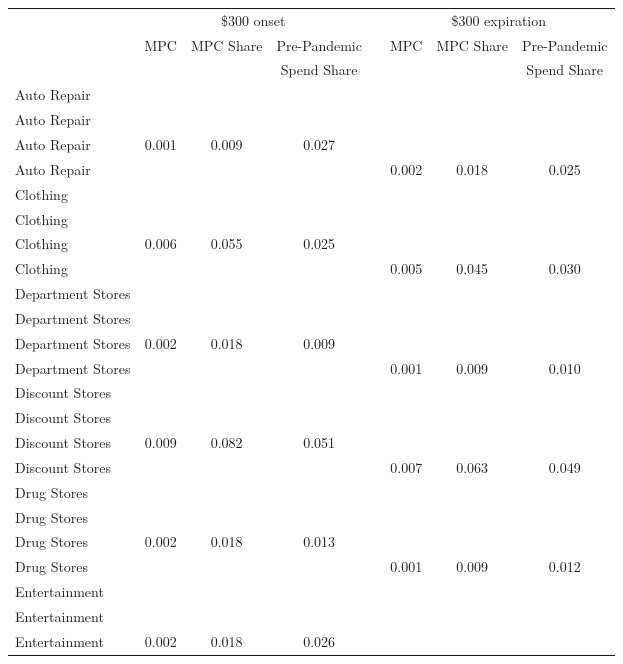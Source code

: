 \begin{table}[ht]
\centering
\begin{tabular}{lccccccc}
   \toprule \toprule & \multicolumn{3}{c}{ \$300 onset} &&\multicolumn{3}{c}{ \$300 expiration}\\ \cmidrule(lr){2-4} \cmidrule(lr){6-8} &MPC & MPC Share & Pre-Pandemic&&MPC & MPC Share & Pre-Pandemic\\  & &   & Spend Share&& &   & Spend Share\\ \midrule    Auto Repair &  &  &  &  &  &  &  \\ 
  Auto Repair &  &  &  &  &  &  &  \\ 
  Auto Repair & 0.001 & 0.009 & 0.027 &  &  &  &  \\ 
  Auto Repair &  &  &  &  & 0.002 & 0.018 & 0.025 \\ 
  Clothing &  &  &  &  &  &  &  \\ 
  Clothing &  &  &  &  &  &  &  \\ 
  Clothing & 0.006 & 0.055 & 0.025 &  &  &  &  \\ 
  Clothing &  &  &  &  & 0.005 & 0.045 & 0.030 \\ 
  Department Stores &  &  &  &  &  &  &  \\ 
  Department Stores &  &  &  &  &  &  &  \\ 
  Department Stores & 0.002 & 0.018 & 0.009 &  &  &  &  \\ 
  Department Stores &  &  &  &  & 0.001 & 0.009 & 0.010 \\ 
  Discount Stores &  &  &  &  &  &  &  \\ 
  Discount Stores &  &  &  &  &  &  &  \\ 
  Discount Stores & 0.009 & 0.082 & 0.051 &  &  &  &  \\ 
  Discount Stores &  &  &  &  & 0.007 & 0.063 & 0.049 \\ 
  Drug Stores &  &  &  &  &  &  &  \\ 
  Drug Stores &  &  &  &  &  &  &  \\ 
  Drug Stores & 0.002 & 0.018 & 0.013 &  &  &  &  \\ 
  Drug Stores &  &  &  &  & 0.001 & 0.009 & 0.012 \\ 
  Entertainment &  &  &  &  &  &  &  \\ 
  Entertainment &  &  &  &  &  &  &  \\ 
  Entertainment & 0.002 & 0.018 & 0.026 &  &  &  &  \\ 

\end{tabular}
\end{table}
